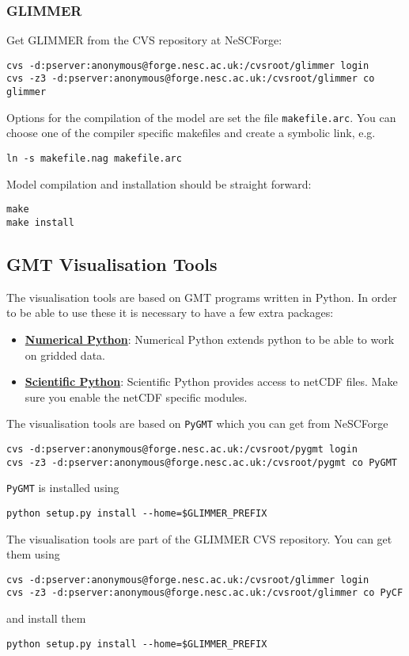 \subsubsection{GLIMMER}
Get GLIMMER from the CVS repository at NeSCForge:
{\small
\begin{verbatim}
cvs -d:pserver:anonymous@forge.nesc.ac.uk:/cvsroot/glimmer login
cvs -z3 -d:pserver:anonymous@forge.nesc.ac.uk:/cvsroot/glimmer co glimmer
\end{verbatim}}

Options for the compilation of the model are set the file \texttt{makefile.arc}. You can choose one of the compiler specific makefiles and create a symbolic link, e.g.
{\small
\begin{verbatim}
ln -s makefile.nag makefile.arc
\end{verbatim}}
Model compilation and installation should be straight forward:
{\small
\begin{verbatim}
make
make install
\end{verbatim}}

\subsection{GMT Visualisation Tools}
The visualisation tools are based on GMT programs written in Python. In order to be able to use these it is necessary to have a few extra packages:
\begin{itemize}
\item \href{http://www.pfdubois.com/numpy/}{{\bf Numerical Python}}: Numerical Python extends python to be able to work on gridded data.
\item \href{http://starship.python.net/~hinsen/ScientificPython/}{{\bf Scientific Python}}: Scientific Python provides access to netCDF files. Make sure you enable the netCDF specific modules.
\end{itemize}

The visualisation tools are based on \texttt{PyGMT} which you can get from NeSCForge
{\small
\begin{verbatim}
cvs -d:pserver:anonymous@forge.nesc.ac.uk:/cvsroot/pygmt login
cvs -z3 -d:pserver:anonymous@forge.nesc.ac.uk:/cvsroot/pygmt co PyGMT
\end{verbatim}}
\texttt{PyGMT} is installed using
{\small
\begin{verbatim}
python setup.py install --home=$GLIMMER_PREFIX
\end{verbatim}}

The visualisation tools are part of the GLIMMER CVS repository. You can get them using
{\small
\begin{verbatim}
cvs -d:pserver:anonymous@forge.nesc.ac.uk:/cvsroot/glimmer login
cvs -z3 -d:pserver:anonymous@forge.nesc.ac.uk:/cvsroot/glimmer co PyCF
\end{verbatim}}
and install them
{\small
\begin{verbatim}
python setup.py install --home=$GLIMMER_PREFIX
\end{verbatim}}